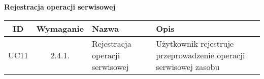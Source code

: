 \begin{table}[!ht]
	\begin{center}
		{\Large\bf Rejestracja operacji serwisowej} \\
	\end{center}
\begin{tabular}{| c | c | p{} | p{} |}
	\hline \textbf{ID} & \textbf{Wymaganie} & \textbf{Nazwa} & \textbf{Opis} \\
	\hline UC11 & 2.4.1. & Rejestracja operacji serwisowej & Użytkownik rejestruje przeprowadzenie operacji serwisowej zasobu \\
	\hline
\end{tabular}
\end{table}

